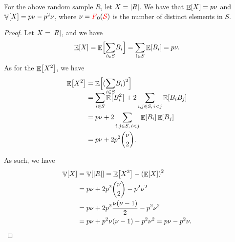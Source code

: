 \begin{lemma}
    For the above random sample $R$, let $X = \left| {R} \right|$. We have
    that $\mathop{\mathbb{E}}\!\left[ {X} \right] = p \nu$ and $\mathop{\mathbb{V}}\!\left[ {X} \right] = p \nu - p^2 \nu$, where
    $\nu = {\textcolor{red}{F}}_0({\textcolor{red}{\mathcal{S}}})$ is the number of distinct elements in $S$.
\end{lemma}
\begin{proof}
    Let $X = \left| {R} \right|$, and we have
    \begin{equation*}
        \Ex{X} = \Ex{\smash{\sum_{i \in S}} B_i \Bigr.}%
        =%
        \sum_{i \in S} \Ex{B_i} %
        =%
        p \nu.
    \end{equation*}
    As for the $\mathop{\mathbb{E}}\!\left[ {X^2} \right]$, we have
    \begin{align*}
        \Ex{X^2}%
        &=%
        \Ex{\pth{\smash{\sum_{i \in S}} B_i }^2 \Bigr.}%
        \\&=%
        \sum_{i \in S} \Ex{B_i^2} %
        +
        2 \sum_{i,j \in S,\, i < j} \Ex{B_i B_j}
        \\&=%
        p \nu
        +
        2 \sum_{i,j \in S,\, i < j} \Ex{B_i}\Ex{ \smash{B_j}}    
        \\&=%
        p \nu + 2p^2 \binom{\nu}{2} .
    \end{align*}
    
    As such, we have
    \begin{align*}
      \Var{X}
      &=%
        \Var{\cardin{R}} %
        =%
        \Ex{X^2} - \pth{\Ex{X}}^2%
      \\&=%
        p \nu + 2p^2 \binom{\nu}{2} - p^2 \nu^2
      \\&=%
        p \nu + 2p^2 \frac{\nu(\nu-1)}{2} - p^2 \nu^2
      \\&%
      =%
      p \nu + p^2 \nu(\nu-1) - p^2 \nu^2
      =%
      p \nu - p^2 \nu.
    \end{align*}
\end{proof}

  
